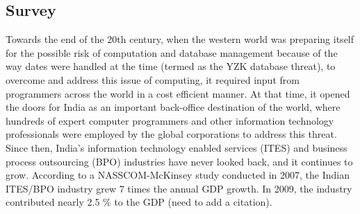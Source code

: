 \subsection{Survey}
 

Towards the end of the 20th century, when the western world was preparing itself for the possible risk of computation and database management because of the way dates were handled at the time (termed as the YZK database threat), to overcome and address this issue of computing, it required input from programmers across the world in a cost efficient manner. At that time, it opened the doors for India as an important back-office destination of the world, where hundreds of expert computer programmers and other information technology professionals were employed by the global corporations to address this threat. Since then, India's information technology enabled services (ITES) and business process outsourcing (BPO) industries  have never looked back, and it continues to grow. According to a NASSCOM-McKinsey study  conducted in 2007, the Indian ITES/BPO industry grew 7 times the annual GDP growth. In 2009, the industry contributed nearly 2.5 \% to the GDP (need to add a citation).

    
    
    
    